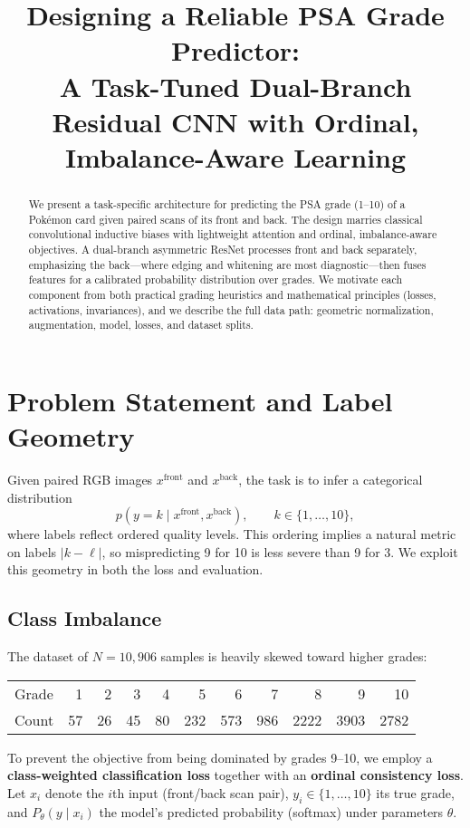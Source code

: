 \documentclass[12pt]{article}
\title{Designing a Reliable PSA Grade Predictor:\\
A Task-Tuned Dual-Branch Residual CNN with Ordinal, Imbalance-Aware Learning}
\author{}
\date{}
\begin{document}
\maketitle

\begin{abstract}
We present a task-specific architecture for predicting the PSA grade (1--10) of a Pokémon card given paired scans of its front and back. 
The design marries classical convolutional inductive biases with lightweight attention and ordinal, imbalance-aware objectives. 
A dual-branch asymmetric ResNet processes front and back separately, emphasizing the back---where edging and whitening are most diagnostic---then fuses features for a calibrated probability distribution over grades. 
We motivate each component from both practical grading heuristics and mathematical principles (losses, activations, invariances), and we describe the full data path: geometric normalization, augmentation, model, losses, and dataset splits.
\end{abstract}

\section{Problem Statement and Label Geometry}
Given paired RGB images $x^{\text{front}}$ and $x^{\text{back}}$, the task is to infer a categorical distribution
\[
p(y=k \mid x^{\text{front}},x^{\text{back}}), \qquad k \in \{1,\dots,10\},
\]
where labels reflect ordered quality levels. 
This ordering implies a natural metric on labels $|k-\ell|$, so mispredicting 9 for 10 is less severe than 9 for 3. 
We exploit this geometry in both the loss and evaluation.

\subsection*{Class Imbalance}
The dataset of $N = 10{,}906$ samples is heavily skewed toward higher grades:

\begin{center}
\begin{tabular}{lrrrrrrrrrr}
\toprule
Grade & 1 & 2 & 3 & 4 & 5 & 6 & 7 & 8 & 9 & 10 \\
Count & 57 & 26 & 45 & 80 & 232 & 573 & 986 & 2222 & 3903 & 2782 \\
\bottomrule
\end{tabular}
\end{center}

To prevent the objective from being dominated by grades 9--10, we employ a \textbf{class-weighted classification loss} together with an \textbf{ordinal consistency loss}. 
Let $x_i$ denote the $i$th input (front/back scan pair), $y_i \in \{1,\dots,10\}$ its true grade, and $P_\theta(y \mid x_i)$ the model’s predicted probability (softmax) under parameters $\theta$.
\end{document}

